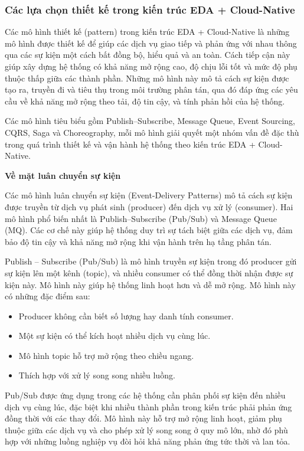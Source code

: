 \subsubsection{Các lựa chọn thiết kế trong kiến trúc EDA + Cloud-Native}
Các mô hình thiết kế (pattern) trong kiến trúc EDA + Cloud-Native là những mô hình được thiết kế để giúp các dịch vụ giao tiếp và phản ứng với nhau thông qua các sự kiện một cách bất đồng bộ, hiểu quả và an toàn. Cách tiếp cận này giúp xây dựng hệ thống có khả năng mở rộng cao, độ chịu lỗi tốt và mức độ phụ thuộc thấp giữa các thành phần. Những mô hình này mô tả cách sự kiện được tạo ra, truyền đi và tiêu thụ trong môi trường phân tán, qua đó đáp ứng các yêu cầu về khả năng mở rộng theo tải, độ tin cậy, và tính phản hồi của hệ thống.

Các mô hình tiêu biểu gồm Publish–Subscribe, Message Queue, Event Sourcing, CQRS, Saga và Choreography\cite{c4-eda}, mỗi mô hình giải quyết một nhóm vấn đề đặc thù trong quá trình thiết kế và vận hành hệ thống theo kiến trúc EDA + Cloud-Native.






\textbf{Về mặt luân chuyển sự kiện}

Các mô hình luân chuyển sự kiện (Event-Delivery Patterns) mô tả cách sự kiện được truyền từ dịch vụ phát sinh (producer) đến dịch vụ xử lý (consumer). Hai mô hình phổ biến nhất là Publish--Subscribe (Pub/Sub) và Message Queue (MQ). Các cơ chế này giúp hệ thống duy trì sự tách biệt giữa các dịch vụ, đảm bảo độ tin cậy và khả năng mở rộng khi vận hành trên hạ tầng phân tán.

Publish -- Subscribe (Pub/Sub) là mô hình truyền sự kiện trong đó producer gửi sự kiện lên một kênh (topic), và nhiều consumer có thể đồng thời nhận được sự kiện này. Mô hình này giúp hệ thống linh hoạt hơn và dễ mở rộng. Mô hình này có những đặc điểm sau:
\begin{itemize}
    \item Producer không cần biết số lượng hay danh tính consumer\cite{c4-eda}.
    \item Một sự kiện có thể kích hoạt nhiều dịch vụ cùng lúc\cite{c4-eda}.
    \item Mô hình topic hỗ trợ mở rộng theo chiều ngang.
    \item Thích hợp với xử lý song song nhiều luồng.
\end{itemize}
Pub/Sub được ứng dụng trong các hệ thống cần phân phối sự kiện đến nhiều dịch vụ cùng lúc, đặc biệt khi nhiều thành phần trong kiến trúc phải phản ứng đồng thời với các thay đổi. Mô hình này hỗ trợ mở rộng linh hoạt, giảm phụ thuộc giữa các dịch vụ và cho phép xử lý song song ở quy mô lớn, nhờ đó phù hợp với những luồng nghiệp vụ đòi hỏi khả năng phản ứng tức thời và lan tỏa.

